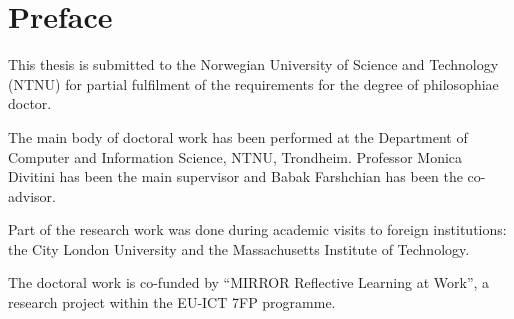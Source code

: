 \chapter{Preface}

This thesis is submitted to the Norwegian University of Science and
Technology (NTNU) for partial fulfilment of the requirements for the
degree of philosophiae doctor.

The main body of doctoral work has been performed at the Department of
Computer and Information Science, NTNU, Trondheim. Professor Monica
Divitini has been the main supervisor and Babak Farshchian has been the
co-advisor.

Part of the research work was done during academic visits to foreign
institutions: the City London University and the Massachusetts
Institute of Technology.

The doctoral work is co-funded by ``MIRROR Reflective Learning at
Work'', a research project within the EU-ICT 7FP programme.
